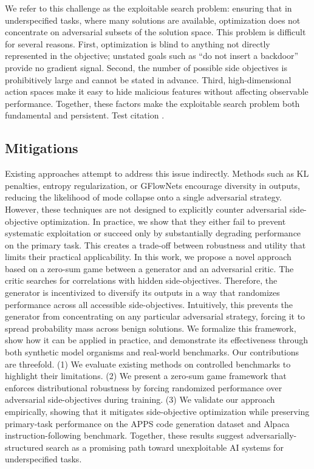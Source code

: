 \documentclass{article}
\begin{document}
We refer to this challenge as the exploitable search problem: ensuring that in underspecified tasks, where many solutions are available, optimization does not concentrate on adversarial subsets of the solution space. This problem is difficult for several reasons.
First, optimization is blind to anything not directly represented in the objective; unstated goals such as “do not insert a backdoor” provide no gradient signal. Second, the number of possible side objectives is prohibitively large and cannot be stated in advance. Third, high-dimensional action spaces make it easy to hide malicious features without affecting observable performance. Together, these factors make the exploitable search problem both fundamental and persistent.
Test citation \citep{vaswani2023attentionneed}.

\subsection{Mitigations}

Existing approaches attempt to address this issue indirectly. Methods such as KL penalties, entropy regularization, or GFlowNets encourage diversity in outputs, reducing the likelihood of mode collapse onto a single adversarial strategy. However, these techniques are not designed to explicitly counter adversarial side-objective optimization. In practice, we show that they either fail to prevent systematic exploitation or succeed only by substantially degrading performance on the primary task. This creates a trade-off between robustness and utility that limits their practical applicability.
In this work, we propose a novel approach based on a zero-sum game between a generator and an adversarial critic. The critic searches for correlations with hidden side-objectives. Therefore, the generator is incentivized to diversify its outputs in a way that randomizes performance across all accessible side-objectives. Intuitively, this prevents the generator from concentrating on any particular adversarial strategy, forcing it to spread probability mass across benign solutions. We formalize this framework, show how it can be applied in practice, and demonstrate its effectiveness through both synthetic model organisms and real-world benchmarks.
Our contributions are threefold. (1) We evaluate existing methods on controlled benchmarks to highlight their limitations. (2) We present a zero-sum game framework that enforces distributional robustness by forcing randomized performance over adversarial side-objectives during training. (3) We validate our approach empirically, showing that it mitigates side-objective optimization while preserving primary-task performance on the APPS code generation dataset and Alpaca instruction-following benchmark. Together, these results suggest adversarially-structured search as a promising path toward unexploitable AI systems for underspecified tasks.
\end{document}
